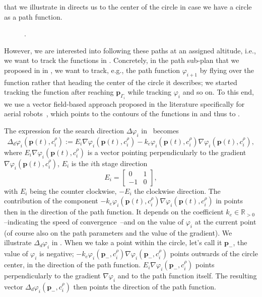  that we illustrate in  directs us to the center of the circle in case we have a circle as a path function.
\begin{figure}[h!]
  \centering
  \selectfont
  
  \caption[.]{.}
  \label{fig:grad_desc}
\end{figure}
However, we are interested into following these paths at an assigned altitude, i.e., we want to track the functions in . Concretely, in the path sub-plan that we proposed in  in , we want to track, e.g., the path function $\varphi_{i+1}$ by flying over the function rather that heading the center of the circle it describes; we started tracking the function after reaching $\mathbf{p}_{\Gamma_i}$ while tracking $\varphi_i$ and so on. To this end, we use a vector field-based approach proposed in the literature specifically for aerial robots~\citep{de2017guidance}, which points to the contours of the functions in  and thus to .

The expression for the search direction $\Delta\varphi_i$ in~\citep{de2017guidance} becomes
\begin{equation}\label{eq:pd}
  \Delta_d\varphi_i(\mathbf{p}(t),c_i^\rho):=E_i\nabla\varphi_i(\mathbf{p}(t),c_i^\rho)-k_e\varphi_i(\mathbf{p}(t),c_i^\rho)\nabla\varphi_i(\mathbf{p}(t),c_i^\rho),
\end{equation}
where $E_i\nabla\varphi_i(\mathbf{p}(t),c_i^\rho)$ is a vector pointing perpendicularly to the gradient $\nabla\varphi_i(\mathbf{p}(t),c_i^\rho)$, $E_i$ is the $i$th stage direction
\begin{equation}
  E_i=\begin{bmatrix}
    0&1\\-1&0
  \end{bmatrix},
\end{equation}
with $E_i$ being the counter clockwise, $-E_i$ the clockwise direction. 
The contribution of the component $-k_e\varphi_i(\mathbf{p}(t),c_i^\rho)\nabla\varphi_i(\mathbf{p}(t),c_i^\rho)$ in  points then in the direction of the path function. It depends on the coefficient $k_e\in\mathbb{R}_{>0}$--indicating the speed of convergence~\citep{de2017guidance}--and on the value of $\varphi_i$ at the current point (of course also on the path parameters and the value of the gradient). We illustrate $\Delta_d\varphi_i$ in . When we take a point within the circle, let's call it $\mathbf{p}_{-}$, the value of $\varphi_i$ is negative; $-k_e\varphi_i(\mathbf{p}_{-},c_i^\rho)\nabla\varphi_i(\mathbf{p}_{-},c_i^\rho)$ points outwards of the circle center, in the direction of the path function. $E_i\nabla\varphi_i(\mathbf{p}_{-},c_i^\rho)$ points perpendicularly to the gradient $\nabla\varphi_i$ and to the path function itself. The resulting vector $\Delta_d\varphi_i(\mathbf{p}_{-},c_i^\rho)$ then points the direction of the path function.

